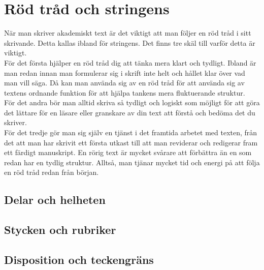 \documentclass[11pt,a4paper,footinclude=true,headinclude=true]{report} %
\begin{document}
\printbibliography[heading=subbibliography]














    
    \chapter{Röd tråd och stringens}

\noindent När man skriver akademiskt text är det viktigt att man följer en röd tråd i sitt skrivande. Detta kallas ibland för stringens. Det finns tre skäl till varför detta är viktigt.\\
\indent För det första hjälper en röd tråd dig att tänka mera klart och tydligt. Ibland är man redan innan man formulerar sig i skrift inte helt och hållet  klar över vad man vill säga. Då kan man använda sig av en röd tråd för att använda sig av textens ordnande funktion för att hjälpa tankens mera fluktuerande struktur.\\
\indent För det andra bör man alltid skriva så tydligt och logiskt som möjligt för att göra det lättare för en läsare eller granskare av din text att förstå och bedöma det du skriver. \\
\indent För det tredje gör man sig själv en tjänst i det framtida arbetet med texten, från det att man har skrivit ett första utkast till att man reviderar och redigerar fram ett färdigt manuskript. En rörig text är mycket svårare att förbättra än en som redan har en tydlig struktur. Alltså, man tjänar mycket tid och energi på att följa en röd tråd redan från början.







\section{Delar och helheten}


\section{Stycken och rubriker}

\section{Disposition och teckengräns}
\end{document}
